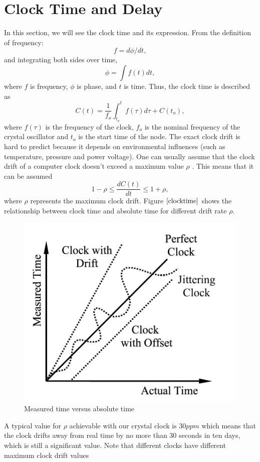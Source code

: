 \documentclass[a4paper,10pt]{report}
\begin{document}
\section{\textbf{Clock Time and Delay}}
In this section, we will see the clock time and its expression. From the definition of frequency:
\begin{equation}
f = d\phi/dt \label{freq_defn} ,
\end{equation}
and integrating both sides over time,
 \begin{equation}
\phi =\int f(t)dt ,
 \end{equation}
where $f$ is frequency, $\phi$ is phase, and $t$ is time.\newline
Thus, the clock time is described as
\begin{equation}
C(t) = \frac{1}{f_o}\int_{t_o}^{t} {f(\tau)d\tau} + C(t_o) ,
\label{clock}
\end{equation}
where $f(\tau)$ is the frequency of the clock, $f_o$ is the nominal frequency of the crystal oscillator and $t_o$ is the start time of
the node. The exact clock drift is hard to predict because it depends on environmental influences (such as temperature, pressure
and power voltage). One can usually assume that the clock drift of a computer clock doesn't exceed a maximum value $\rho$ . This means
that it can be assumed
\begin{equation}
1-\rho \leq \frac{dC(t)}{dt} \leq 1+\rho ,
\end{equation}
where $\rho$ represents the maximum clock drift. Figure $\ref{clocktime}$ shows the relationship between clock time and absolute time for different drift rate $\rho$.
\begin{figure}
\centering
\includegraphics[width=0.5 \textwidth]{actualvsmeasuredtime}
\caption{Measured time versus absolute time} \label{clocktime}
\end{figure}
\newline
A typical value for $\rho$ achievable with our crystal clock is $30ppm$ which means that the clock drifts away from real time by no more than 30 seconds in ten days, which is still a significant value. Note that different clocks have different maximum clock drift values
\end{document}
